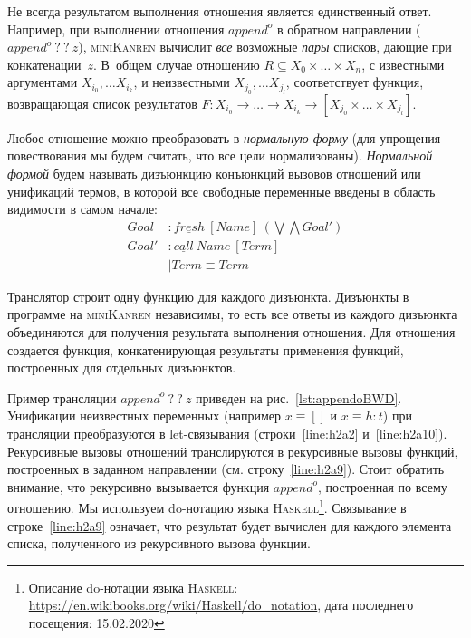 \documentclass[conference,a4paper,american,russian]{IEEEtran}
\newcommand{\miniKanren}{\textsc{miniKanren}}
\newcommand{\haskell}{\textsc{Haskell}}
\begin{document}
Не всегда результатом выполнения отношения является единственный ответ.
Например, при выполнении отношения $append^o$ в обратном направлении ($append^o \ ? \ ? \ z$), \miniKanren{} вычислит \emph{все} возможные \emph{пары} списков, дающие при конкатенации~$z$.
В~общем случае отношению $R \subseteq X_0 \times \dots \times X_n$, с известными аргументами $X_{i_0}, \dots X_{i_k}$, и неизвестными $X_{j_0}, \dots X_{j_l}$, соответствует функция, возвращающая список результатов $F : X_{i_0} \to \dots \to X_{i_k} \to [X_{j_0} \times \dots \times X_{j_l}]$.

Любое отношение можно преобразовать в \emph{нормальную форму} (для упрощения повествования мы будем считать, что все цели нормализованы).
\emph{Нормальной формой} будем называть дизъюнкцию конъюнкций вызовов отношений или унификаций термов, в которой все свободные переменные введены в область видимости в самом начале:
\begin{align*}
  Goal  &: \underline{fresh} \ [Name] \ (\bigvee \bigwedge Goal') \\
  Goal' &: \underline{call} \ Name \ [Term] \\
        &\mid Term \equiv Term
\end{align*}

Транслятор строит одну функцию для каждого дизъюнкта.
Дизъюнкты в программе на \miniKanren{} независимы, то есть все ответы из каждого дизъюнкта объединяются для получения результата выполнения отношения.
Для отношения создается функция, конкатенирующая результаты применения функций, построенных для отдельных дизъюнктов.

Пример трансляции $append^o \ ? \ ? \ z$ приведен на рис.~\ref{lst:appendoBWD}.
Унификации неизвестных переменных (например $x \equiv []$ и $x \equiv h : t$) при трансляции преобразуются в let-связывания (строки~\ref{line:h2a2} и~\ref{line:h2a10}).
Рекурсивные вызовы отношений транслируются в рекурсивные вызовы функций, построенных в заданном направлении (см. строку~\ref{line:h2a9}).
Стоит обратить внимание, что рекурсивно вызывается функция $append^o$, построенная по всему отношению.
Мы используем do-нотацию языка \haskell{}\footnote{Описание do-нотации языка \haskell{}: \url{https://en.wikibooks.org/wiki/Haskell/do\_notation}, дата последнего посещения: 15.02.2020}.
Связывание в строке~\ref{line:h2a9} означает, что результат будет вычислен для каждого элемента списка, полученного из рекурсивного вызова функции.
\end{document}
